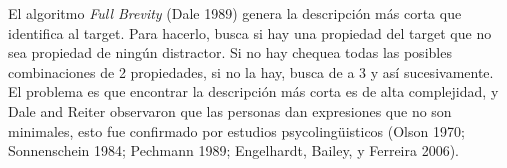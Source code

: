 


El algoritmo {\it Full Brevity} (Dale 1989) genera la descripci\'on m\'as corta que identifica al target. Para hacerlo, 
busca si hay una propiedad del target que no sea propiedad de ning\'un distractor. Si no hay chequea todas las posibles combinaciones de 2 propiedades, si no la hay, busca de a 3 y as\'i sucesivamente.\\

El problema es que encontrar la descripci\'on m\'as corta es de alta complejidad, y Dale and Reiter observaron que las personas dan expresiones que no son minimales, esto fue confirmado por estudios psycoling\"uisticos (Olson  1970;  Sonnenschein  1984; Pechmann 1989; Engelhardt, Bailey, y Ferreira 2006).\\

